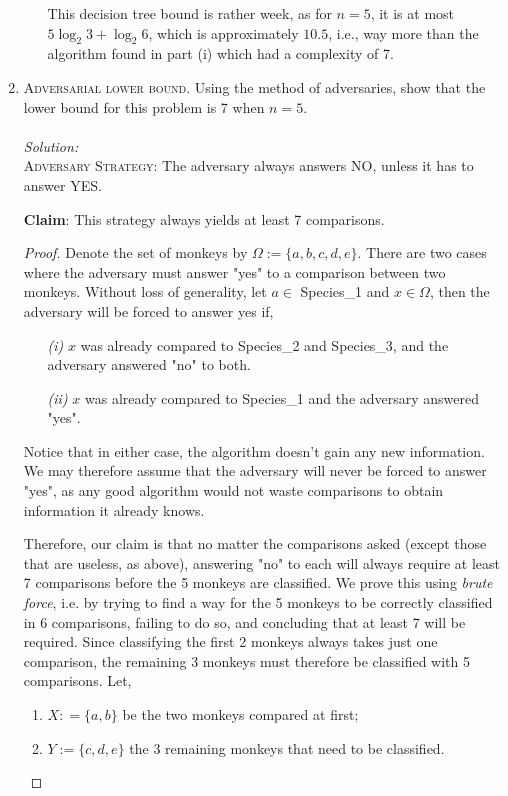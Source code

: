 \documentclass[12pt]{article}
\theoremstyle{definition}
\theoremstyle{remark}
\newcommand\sol{%
  \\ 
  \\
  \textit{Solution:}\\%
}
\begin{document}
\begin{enumerate}
\begin{enumerate}
    This decision tree bound is rather week, as for $n =5$, it is at most $5 \log_2 3 + \log_2 6$, which is approximately $10.5$, i.e., way more than the algorithm found in part (i) which had a complexity of 7. 

     \end{enumerate}
  \newpage
  \item \textsc{Adversarial lower bound.} Using the method of adversaries, show that the lower bound for this problem is 7 when $n = 5$. 
  \sol 
  \textsc{Adversary Strategy:} The adversary always answers NO, unless it has to answer YES.

  \textbf{Claim}: This strategy always yields at least 7 comparisons.
  \begin{proof} 
    Denote the set of monkeys by $\Omega := \{a,b, c,d,e\}$. There are two cases where the adversary must answer "yes" to a comparison between two monkeys. Without loss of generality, let $a \in $ Species\_1 and $x\in \Omega$, then the adversary will be forced to answer yes if,
    \begin{enumerate}
      \item[\it (i)] $x$ was already compared to Species\_2 and Species\_3, and the adversary answered "no" to both.
      \item[\it (ii)] $x$ was already compared to Species\_1 and the adversary answered "yes". 
    \end{enumerate}
    Notice that in either case, the algorithm doesn't gain any new information. We may therefore assume that the adversary will never be forced to answer "yes", as any good algorithm would not waste comparisons to obtain information it already knows. 
    
    \hspace{24pt}Therefore, our claim is that no matter the comparisons asked (except those that are useless, as above), answering "no" to each will always require at least 7 comparisons before the 5 monkeys are classified. We prove this using \textit{brute force}, i.e. by trying to find a way for the 5 monkeys to be correctly classified in 6 comparisons, failing to do so, and concluding that at least 7 will be required. Since classifying the first 2 monkeys always takes just one comparison, the remaining 3 monkeys must therefore be classified with 5 comparisons. Let,
    \begin{enumerate}
      \item $X : =\{a, b\}$ be the two monkeys compared at first;  
      \item $Y:= \{c,d,e\}$ the 3 remaining monkeys that need to be classified. 
    \end{enumerate}


\end{proof}
\end{enumerate}
\end{document}
